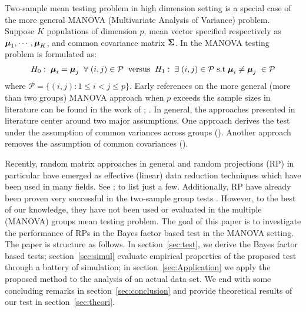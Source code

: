 \documentclass[12pt]{article}
\def\be{\begin{eqnarray}}
\def\ee{\end{eqnarray}}
\newcommand{\umu}               {\mbox{\boldmath$\mu$}}
\newcommand{\uSigma}            {\mbox{\boldmath$\Sigma$}}
\begin{document}
Two-sample mean testing problem in high dimension setting is a special case of the more general MANOVA (Multivariate Analysis of Variance) problem. Suppose $K$ populations of dimension $p$, mean vector specified respectively as $\umu_1, \cdots, \umu_{K}$, and common covariance matrix $\uSigma$. In the MANOVA testing problem is formulated as:
\be
H_{0}:\; \umu_i = \umu_j\; \; \forall \; (i,j) \in \mathcal{P}\;  \; \mbox{versus} \; \; H_{1}:\; \exists \; (i,j) \in \mathcal{P}\; \mbox{s.t}   \; \umu_i \neq \umu_j\; \in \mathcal{P}  \label{eq:test1}
\ee
where $\mathcal{P} = \{(i,j): 1 \leq i < j \leq p  \}$.
Early references on the more general (more than two groups) MANOVA approach when $p$ exceeds the sample sizes in literature can be found in the work of \cite{dempster1958high}; \cite{dempster1960significance}. In general, the approaches presented in literature center around two major assumptions. One approach derives the test under the assumption of common variances across groups (\cite{fujikoshi2004asymptotic}). Another approach removes the assumption of common covariances (\citealp{srivastava2007multivariate}).

 Recently, random matrix approaches in general and random projections (RP) in particular have emerged as effective (linear) data reduction techniques which have been used in many fields. See \citealp{wan2020sharp}; \citealp{lopez2021tuning} to list just a few. Additionally, RP have already been proven very successful in the two-sample group tests \cite{lopes2011more, srivastava2014raptt,zoh2018powerful}. However, to the best of our knowledge, they have not been used or evaluated in the multiple (MANOVA) groups mean testing problem. The goal of this paper is to investigate the performance of RPs in the Bayes factor based test in the MANOVA setting. The paper is structure as follows. In section~\ref{sec:test}, we derive the Bayes factor based tests; section~\ref{sec:simul} evaluate empirical properties of the proposed test through a battery of simulation; in section~\ref{sec:Application} we apply the proposed method to the analysis of an actual data set. We end with some concluding remarks in section~\ref{sec:conclusion} and provide theoretical results of our test in section~\ref{sec:theori}.
\end{document}
